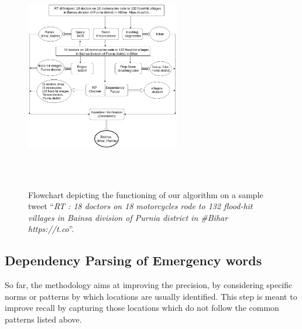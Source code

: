 \begin{figure}[tb]
	\centering
		\includegraphics[height=10cm, width=0.6\textwidth]{Flowchart}
		\caption{Flowchart depicting the functioning of our algorithm on a sample tweet ``{\it RT \@firstpost: 18 doctors on 18 motorcycles rode to 132 flood-hit villages in Bainsa division of Purnia district in \#Bihar  https://t.co}''.}
		\label{fig:Flowchart}
\vspace*{-5mm}
\end{figure}





\subsection{Dependency Parsing of Emergency words}

So far, the  methodology aims at improving the precision, by considering specific norms or patterns by which locations are usually identified. This step is meant to improve recall by capturing those locations which do not follow the common patterns listed above.

